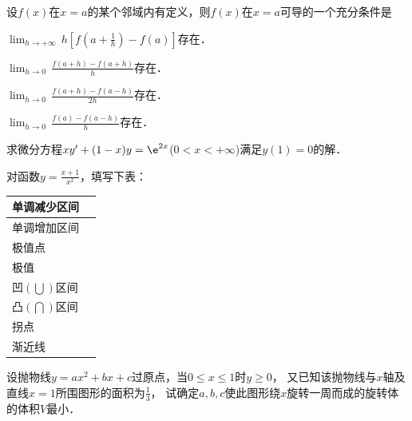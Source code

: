 \documentclass[plain,noanswer,medmath]{../../template/jnuexam}
\begin{document}
\begin{problem}
设$f(x)$在$x=a$的某个邻域内有定义，则$f(x)$在$x=a$可导的一个充分条件是 \pickout{}
\begin{abcd}
\item $\lim_{h\to +\infty}\,h[f(a+\frac{1}{h})-f(a)]$存在．
\item $\lim_{h\to 0}\,\frac{f(a+h)-f(a+h)}{h}$存在．
\item $\lim_{h\to 0}\,\frac{f(a+h)-f(a-h)}{2h}$存在．
\item $\lim_{h\to 0}\,\frac{f(a)-f(a-h)}{h}$存在．
\end{abcd}
\end{problem}



\begin{problem}
求微分方程$xy'+(1-x)y=\e^{2x}$($0<x<+\infty$)满足$y(1)=0$的解．
\end{problem}









\begin{problem}
对函数$y=\frac{x+1}{x^2}$，填写下表： \par
\begin{tabularx}{\linewidth}{|>{\qquad}X|>{\qquad}X|}
\hline
  单调减少区间 &  \\
\hline
  单调增加区间 &  \\
\hline
  极值点 &  \\
\hline
  极值 &  \\
\hline
  凹$\left(\bigcup\right)$区间 &  \\
\hline
  凸$\left(\bigcap\right)$区间 &  \\
\hline
  拐点 &  \\
\hline
  渐近线 &  \\
\hline
\end{tabularx}
\end{problem}



\begin{problem}
设抛物线$y=ax^2+bx+c$过原点，当$0\le x\le 1$时$y\ge 0$，
又已知该抛物线与$x$轴及直线$x=1$所围图形的面积为$\frac{1}{3}$，
试确定$a,b,c$使此图形绕$x$旋转一周而成的旋转体的体积$V$最小．
\end{problem}
\end{document}
